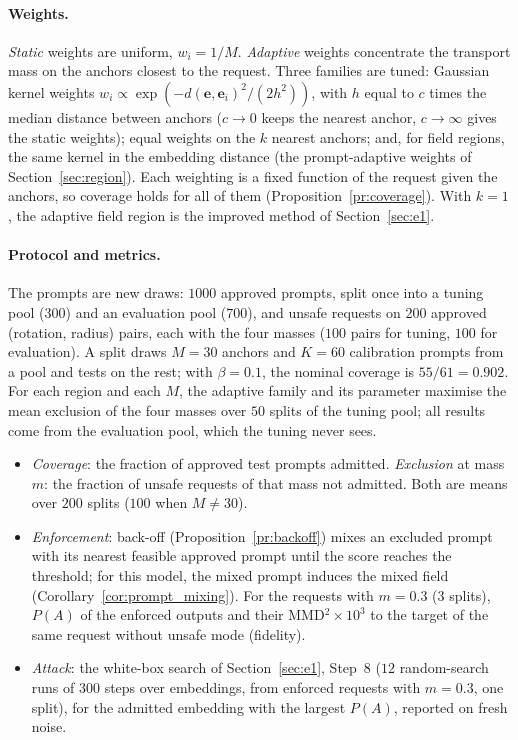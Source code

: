 \documentclass{article}
\newcommand{\be}{\mathbf{e}}
\theoremstyle{plain}
\theoremstyle{remark}
\begin{document}
\paragraph{Weights.}
\emph{Static} weights are uniform, $w_i=1/M$. \emph{Adaptive} weights concentrate the transport mass on the anchors closest to the
request. Three families are tuned: Gaussian kernel weights $w_i\propto\exp(-d(\be,\be_i)^2/(2h^2))$, with $h$ equal to $c$ times the
median distance between anchors ($c\to0$ keeps the nearest anchor, $c\to\infty$ gives the static weights); equal weights on the $k$
nearest anchors; and, for field regions, the same kernel in the embedding distance (the prompt-adaptive weights of
Section~\ref{sec:region}). Each weighting is a fixed function of the request given the anchors, so coverage holds for all of them
(Proposition~\ref{pr:coverage}). With $k=1$, the adaptive field region is the improved method of Section~\ref{sec:e1}.

\paragraph{Protocol and metrics.}
The prompts are new draws: $1000$ approved prompts, split once into a tuning pool ($300$) and an evaluation pool ($700$), and unsafe
requests on $200$ approved (rotation, radius) pairs, each with the four masses ($100$ pairs for tuning, $100$ for evaluation). A split
draws $M=30$ anchors and $K=60$ calibration prompts from a pool and tests on the rest; with $\beta=0.1$, the nominal coverage is
$55/61=0.902$. For each region and each $M$, the adaptive family and its parameter maximise the mean exclusion of the four masses
over $50$ splits of the tuning pool; all results come from the evaluation pool, which the tuning never sees.
\begin{itemize}
\item \emph{Coverage}: the fraction of approved test prompts admitted. \emph{Exclusion} at mass $m$: the fraction of unsafe requests
of that mass not admitted. Both are means over $200$ splits ($100$ when $M\ne30$).
\item \emph{Enforcement}: back-off (Proposition~\ref{pr:backoff}) mixes an excluded prompt with its nearest feasible approved prompt
until the score reaches the threshold; for this model, the mixed prompt induces the mixed field (Corollary~\ref{cor:prompt_mixing}).
For the requests with $m=0.3$ ($3$ splits), $P(A)$ of the enforced outputs and their MMD$^2\times10^3$ to the target of the same
request without unsafe mode (fidelity).
\item \emph{Attack}: the white-box search of Section~\ref{sec:e1}, Step~8 ($12$ random-search runs of $300$ steps over embeddings,
from enforced requests with $m=0.3$, one split), for the admitted embedding with the largest $P(A)$, reported on fresh noise.
\end{itemize}
\FloatBarrier
\end{document}
